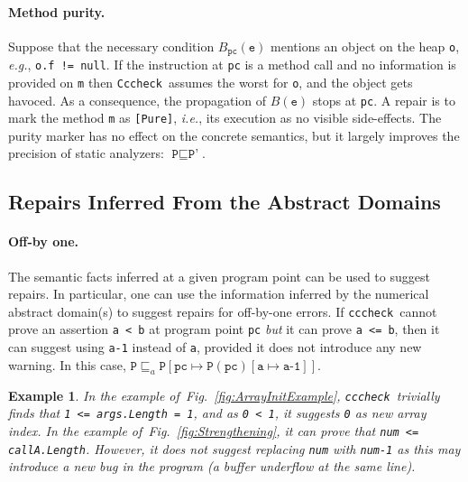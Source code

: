 \documentclass[10pt]{sigplanconf}
\newtheorem{example}{Example}
\newcommand{\refFig}[1]{Fig.~\ref{fig:#1}}
\newcommand{\code}[1]{\texttt{#1}}
\newcommand{\clousot}{\code{cccheck}}
\newcommand{\Clousot}{\code{Cccheck}}
\begin{document}
\paragraph{Method purity.}
Suppose that the necessary condition ${B}_\code{pc}(\code{e})$ mentions an object on the heap \code{o}, \emph{e.g.}, \code{o.f != null}. 
If the instruction at \code{pc} is a method call and no information is provided on \code{m}  then \Clousot\ assumes the worst for \code{o}, and the object gets havoced.
As a consequence, the propagation of ${B}(\code{e})$ stops at \code{pc}.
A  repair  is to mark the method \code{m} as \code{[Pure]}, \emph{i.e.}, its execution as no visible side-effects.
The purity marker has no effect on the concrete semantics, but it largely improves the precision of static analyzers:   $\code{P} \sqsubseteq \code{P'}$.



\subsection{Repairs Inferred From the Abstract Domains}

\paragraph{Off-by one.}
The semantic facts inferred at a given program point can be used to
suggest repairs.  In particular, one can use the information inferred
by the numerical abstract domain(s) to suggest repairs for off-by-one
errors.  If \clousot\ cannot prove an assertion \code{a < b} at
program point \code{pc} \emph{but} it can prove \code{a <= b}, then it
can suggest using \code{a-1} instead of \code{a}, provided it does not
introduce any new warning.  In this case, $\code{P} \sqsubseteq_a
\code{P}[\code{pc} \mapsto \code{P}(\code{pc})[\code{a} \mapsto
\code{a-1}]]$.

\begin{example}\normalfont
In the example of~\refFig{ArrayInitExample}, \clousot\ trivially
finds that \code{1 <= args.Length = 1}, and as \code{0 < 1}, it
suggests \code{0} as new array index.  In the example
of~\refFig{Strengthening}, it can prove that \code{num <=
callA.Length}.  However, it does not suggest replacing \code{num} with
\code{num-1} as this may introduce a new bug in the program (a buffer
underflow at the same line). 
\end{example}
\end{document}
